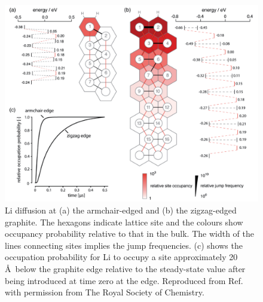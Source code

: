\documentclass[../main.tex]{subfiles}
\begin{document}
\begin{figure}
    \centering
    \includegraphics[scale=0.5]{figures/Graphite_edge_effects.PNG}
    \caption{Li diffusion at (a) the armchair-edged and (b) the zigzag-edged graphite. The hexagons indicate lattice site and the colours show occupancy probability relative to that in the bulk. The width of the lines connecting sites implies the jump frequencies. (c) shows the occupation probability for Li to occupy a site approximately 20 \AA \ below the graphite edge relative to the steady-state value after being introduced at time zero at the edge. Reproduced from Ref.~ with permission from The Royal Society of Chemistry.}
    \label{fig:Li_diffusion_edge}
\end{figure}
\end{document}
